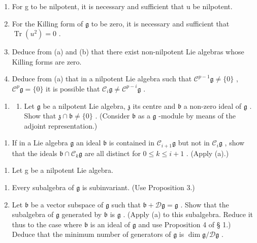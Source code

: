 \begin{enumerate}
\def\labelenumi{(\alph{enumi})}
\item
  For g to be nilpotent, it is necessary and sufficient that u be nilpotent.
\item
  For the Killing form of \(\mathfrak{g}\) to be zero, it is necessary and sufficient that \(\operatorname{Tr}(u^2) = 0\) .
\item
  Deduce from (a) and (b) that there exist non-nilpotent Lie algebras whose Killing forms are zero.
\item
  Deduce from (a) that in a nilpotent Lie algebra such that \(\mathcal{C}^{p-1}\mathfrak{g} \neq \{0\}\) , \(\mathcal{C}^p\mathfrak{g} = \{0\}\) it is possible that \(\mathcal{C}_i\mathfrak{g} \neq \mathcal{C}^{p-i}\mathfrak{g}\) .
\end{enumerate}

\begin{enumerate}
\def\labelenumi{\arabic{enumi}.}
\setcounter{enumi}{2}
\tightlist
\item
  \begin{enumerate}
  \def\labelenumii{(\alph{enumii})}
  \tightlist
  \item
    Let \(\mathfrak{g}\) be a nilpotent Lie algebra, \(\mathfrak{z}\) its centre and \(\mathfrak{b}\) a non-zero ideal of \(\mathfrak{g}\) . Show that \(\mathfrak{z} \cap \mathfrak{b} \neq \{0\}\) . (Consider \(\mathfrak{b}\) as a \(\mathfrak{g}\) -module by means of the adjoint representation.)
  \end{enumerate}
\end{enumerate}

\begin{enumerate}
\def\labelenumi{(\alph{enumi})}
\setcounter{enumi}{1}
\tightlist
\item
  If in a Lie algebra \(\mathfrak{g}\) an ideal \(\mathfrak{b}\) is contained in \(\mathcal{C}_{i+1}\mathfrak{g}\) but not in \(\mathcal{C}_i\mathfrak{g}\) , show that the ideals \(\mathfrak{b} \cap \mathcal{C}_k\mathfrak{g}\) are all distinct for \(0 \leqslant k \leqslant i + 1\) . (Apply (a).)
\end{enumerate}

\begin{enumerate}
\def\labelenumi{\arabic{enumi}.}
\setcounter{enumi}{3}
\tightlist
\item
  Let g be a nilpotent Lie algebra.
\end{enumerate}

\begin{enumerate}
\def\labelenumi{(\alph{enumi})}
\item
  Every subalgebra of \(\mathfrak{g}\) is subinvariant. (Use Proposition 3.)
\item
  Let \(\mathfrak{b}\) be a vector subspace of \(\mathfrak{g}\) such that \(\mathfrak{b} + \mathcal{D}\mathfrak{g} = \mathfrak{g}\) . Show that the subalgebra of \(\mathfrak{g}\) generated by \(\mathfrak{b}\) is \(\mathfrak{g}\) . (Apply (a) to this subalgebra. Reduce it thus to the case where \(\mathfrak{b}\) is an ideal of \(\mathfrak{g}\) and use Proposition 4 of § 1.) Deduce that the minimum number of generators of \(\mathfrak{g}\) is \(\dim \mathfrak{g}/\mathcal{D}\mathfrak{g}\) .
\end{enumerate}

